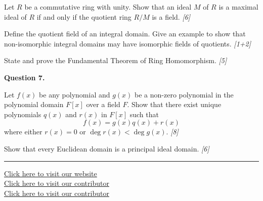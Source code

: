 \documentclass[11pt,a4paper]{article}
\newcommand{\pts}[1]{\hfill   \textit{[#1]}}
\begin{document}
\begin{parts}
  \item Let $R$ be a commutative ring with unity. Show that an ideal $M$ of $R$ is a maximal ideal of $R$ if and only if the quotient ring $R/M$ is a field. \pts{6}
  \item Define the quotient field of an integral domain. Give an example to show that non-isomorphic integral domains may have isomorphic fields of quotients. \pts{1+2}
  \item State and prove the Fundamental Theorem of Ring Homomorphism. \pts{5}
\end{parts}

\medskip


\noindent   \textbf{Question 7.}

\begin{parts}
  \item Let $f(x)$ be any polynomial and $g(x)$ be a non-zero polynomial in the polynomial domain $F[x]$ over a field $F$. Show that there exist unique polynomials $q(x)$ and $r(x)$ in $F[x]$ such that
  \[ f(x) = g(x)q(x) + r(x) \]
  where either $r(x) = 0$ or $\deg r(x) < \deg g(x)$. \pts{8}
  \item Show that every Euclidean domain is a principal ideal domain. \pts{6}
\end{parts}



\vfill
\rule{\linewidth}{0.4pt}

\begin{center}\small
\href{https://bhu-exam.vercel.app/}{Click here to visit our website}\\[4pt]\href{https://me-aryan.vercel.app/}{Click here to visit our contributor}\\[4pt]\href{https://quashan-me.vercel.app/}{Click here to visit our contributor}
\end{center}
\end{document}
